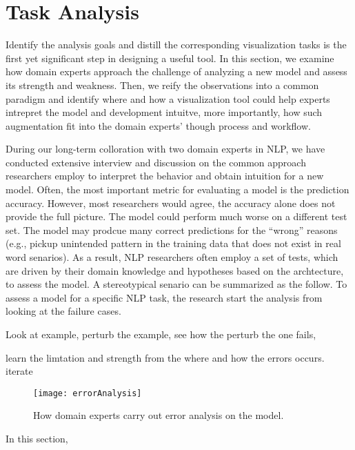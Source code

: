 \section{Task Analysis}
\label{sec:task}
Identify the analysis goals and distill the corresponding visualization tasks is the first yet significant step in designing a useful tool. In this section, we examine how domain experts approach the challenge of analyzing a new model and assess its strength and weakness.
Then, we reify the observations into a common paradigm and identify where and how a visualization tool could help experts intrepret the model and development intuitve, more importantly, how such augmentation fit into the domain experts' though process and workflow.

During our long-term colloration with two domain experts in NLP, we have conducted extensive interview and discussion on the common approach researchers employ to interpret the behavior and obtain intuition for a new model.
%
Often, the most important metric for evaluating a model is the prediction accuracy. However, most researchers would agree, the accuracy alone does not provide the full picture. The model could perform much worse on a different test set. The model may prodcue many correct predictions for the ``wrong'' reasons (e.g., pickup unintended pattern in the training data that does not exist in real word senarios).
%
As a result, NLP researchers often employ a set of tests, which are driven by their domain knowledge and hypotheses based on the archtecture, to assess the model.
%
A stereotypical senario can be summarized as the follow.
%
To assess a model for a specific NLP task, the research start the analysis from looking at the failure cases.


Look at example, perturb the example, see how the perturb the one fails,

learn the limtation and strength from the where and how the errors occurs. iterate 


\begin{figure}[htbp]
\centering
\vspace{-2mm}
 \texttt{[image: errorAnalysis]}
 \caption{How domain experts carry out error analysis on the model.}
\label{fig:modelPipeline}
\end{figure}

In this section,
